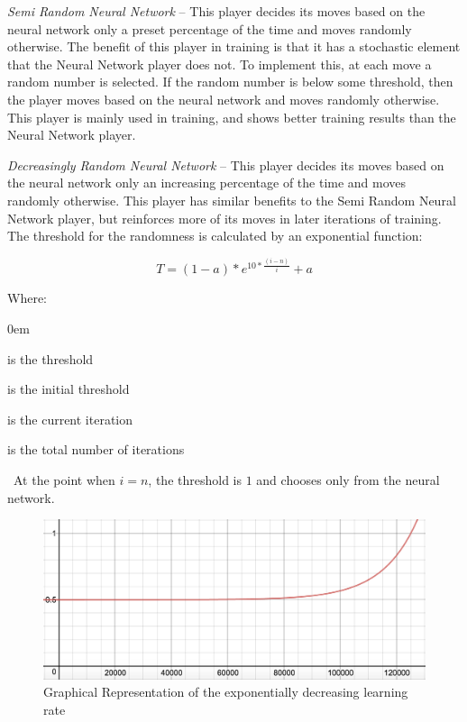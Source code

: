 \documentclass{sig-alternate-05-2015}
\begin{document}
\emph{Semi Random Neural Network} -- This player decides its moves based on the neural network only a preset percentage of the time and moves randomly otherwise. The benefit of this player in training is that it has a stochastic element that the Neural Network player does not. To implement this, at each move a random number is selected. If the random number is below some threshold, then the player moves based on the neural network and moves randomly otherwise. This player is mainly used in training, and shows better training results than the Neural Network player.

\emph{Decreasingly Random Neural Network} -- This player decides its moves based on the neural network only an increasing percentage of the time and moves randomly otherwise. This player has similar benefits to the Semi Random Neural Network player, but reinforces more of its moves in later iterations of training. The threshold for the randomness is calculated by an exponential function:

\begin{equation}
T = (1-a) * e^{10 * \frac{(i-n)}{i} }+ a
\end{equation}

Where:
\begin{description}
\itemsep0em 
\item [t] is the threshold 
\item [a] is the initial threshold
\item [i] is the current iteration
\item [n] is the total number of iterations
\end{description} 
\
At the point when $i = n$, the threshold is $1$ and chooses only from the neural network.

\begin{figure}[h!]
  \includegraphics[width=\linewidth]{e-rate.png}
  \caption{Graphical Representation of the exponentially decreasing learning rate}
  \label{fig:neuron4}
\end{figure}
\end{document}
